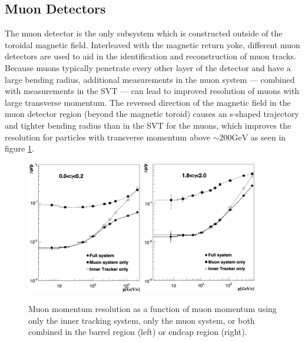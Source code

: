 \subsection{Muon Detectors}
\label{subsec:muondetector}
The muon detector is the only subsystem which is constructed outside of the toroidal magnetic field. Interleaved with the magnetic return yoke, different muon detectors are used to aid in the identification and reconstruction of muon tracks. Because muons typically penetrate every other layer of the detector and have a large bending radius, additional measurements in the muon system --- combined with measurements in the SVT --- can lead to improved resolution of muons with large transverse momentum. The reversed direction of the magnetic field in the muon detector region (beyond the magnetic toroid) causes an s-shaped trajectory and tighter bending radius than in the SVT for the muons, which improves the resolution for particles with transverse momentum above $\sim200\text{GeV}$ as seen in figure \ref{fig:muonSigma}.
 \begin{figure}
	\centering
	\includegraphics[width=0.45\textwidth]{detector/figs/muonResInner}
	\includegraphics[width=0.45\textwidth]{detector/figs/muonResOuter}
	\renewcommand{\baselinestretch}{1.0}
	\caption[Muon momentum resolution as a function of muon momentum using only the inner tracking system, only the muon system, or both combined in the barrel region (left) or endcap region (right).]{Muon momentum resolution as a function of muon momentum using only the inner tracking system, only the muon system, or both combined in the barrel region (left) or endcap region (right).}
	\label{fig:muonSigma}
\end{figure}

